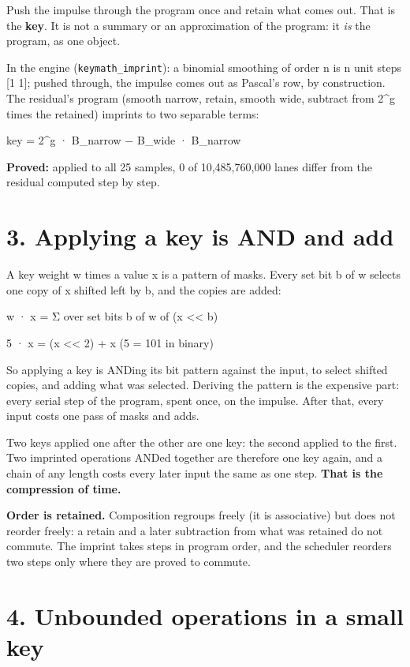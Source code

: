 Push the impulse through the program once and retain what comes out. That is the \textbf{key}. It is not a summary or an approximation of the program: it \emph{is} the program, as one object.

In the engine (\texttt{keymath\_\allowbreak{}imprint}): a binomial smoothing of order n is n unit steps [1 1]; pushed through, the impulse comes out as Pascal's row, by construction. The residual's program (smooth narrow, retain, smooth wide, subtract from 2\textasciicircum{}g times the retained) imprints to two separable terms:

key = 2\textasciicircum{}g · B\_\allowbreak{}narrow − B\_\allowbreak{}wide · B\_\allowbreak{}narrow

\textbf{Proved:} applied to all 25 samples, 0 of 10,485,760,000 lanes differ from the residual computed step by step.

\section{\texorpdfstring{3. Applying a key is AND and add}{3. Applying a key is AND and add}}

A key weight w times a value x is a pattern of masks. Every set bit b of w selects one copy of x shifted left by b, and the copies are added:

w · x = Σ over set bits b of w of (x << b)

5 · x = (x << 2) + x         (5 = 101 in binary)

So applying a key is ANDing its bit pattern against the input, to select shifted copies, and adding what was selected. Deriving the pattern is the expensive part: every serial step of the program, spent once, on the impulse. After that, every input costs one pass of masks and adds.

Two keys applied one after the other are one key: the second applied to the first. Two imprinted operations ANDed together are therefore one key again, and a chain of any length costs every later input the same as one step. \textbf{That is the compression of time.}

\textbf{Order is retained.} Composition regroups freely (it is associative) but does not reorder freely: a retain and a later subtraction from what was retained do not commute. The imprint takes steps in program order, and the scheduler reorders two steps only where they are proved to commute.

\section{\texorpdfstring{4. Unbounded operations in a small key}{4. Unbounded operations in a small key}}

